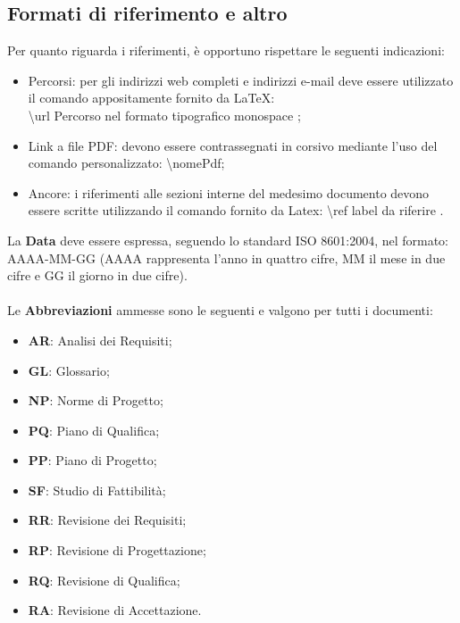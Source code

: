 {		\subsection{Formati di riferimento e altro}{
			\label{sub:rif}
			Per quanto riguarda i riferimenti, \`{e} opportuno rispettare le seguenti indicazioni:
			\begin{itemize}
				\item Percorsi: per gli indirizzi\ped{g} web completi e indirizzi e-mail deve essere utilizzato il comando appositamente fornito da \LaTeX:\\ \textbackslash url \textbraceleft Percorso nel formato tipografico monospace \textbraceright;
				\item Link\ped{g} a file PDF: devono essere contrassegnati in corsivo mediante l’uso del comando personalizzato: \textbackslash nomePdf;
				\item Ancore: i riferimenti alle sezioni interne del medesimo documento devono essere scritte utilizzando il comando fornito da Latex: \textbackslash ref \textbraceleft label da riferire \textbraceright .
			\end{itemize}
			La \textbf{Data} deve essere espressa, seguendo lo standard ISO 8601:2004, nel formato: AAAA-MM-GG (AAAA rappresenta l'anno in quattro cifre, MM il mese in due cifre e GG il giorno in due cifre).\\
			\\
			Le \textbf{Abbreviazioni} ammesse sono le seguenti e valgono per tutti i documenti:
			\begin{itemize}
				\item \textbf{AR}: Analisi dei Requisiti;
				\item \textbf{GL}: Glossario;
				\item \textbf{NP}: Norme di Progetto;
				\item \textbf{PQ}: Piano di Qualifica;
				\item \textbf{PP}: Piano di Progetto;
				\item \textbf{SF}: Studio di Fattibilit\`{a};
				\item \textbf{RR}: Revisione dei Requisiti;
				\item \textbf{RP}: Revisione di Progettazione;
				\item \textbf{RQ}: Revisione di Qualifica;
				\item \textbf{RA}: Revisione di Accettazione.
			\end{itemize}
}}
